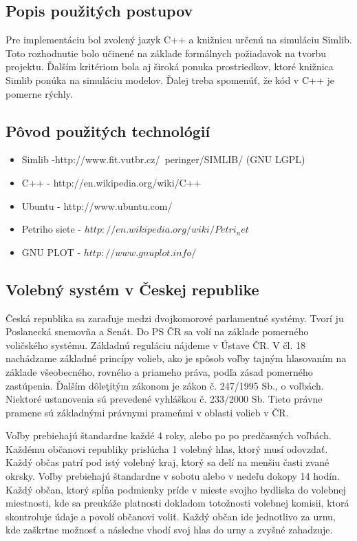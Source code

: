 \documentclass[12pt,a4paper,titlepage,final]{article}
\begin{document}
\subsection{Popis použitých postupov}
Pre implementáciu bol zvolený jazyk C++ a knižnicu určenú na simuláciu Simlib. Toto rozhodnutie bolo učinené na základe formálnych požiadavok na tvorbu projektu. Ďalším kritériom bola aj široká ponuka prostriedkov, ktoré knižnica Simlib ponúka na simuláciu modelov. Ďalej treba spomenúť, že kód v C++ je pomerne rýchly.



\subsection{Pôvod použitých technológií}
\begin{itemize}
\item Simlib -http://www.fit.vutbr.cz/~peringer/SIMLIB/ (GNU LGPL)
\item C++ - http://en.wikipedia.org/wiki/C++
\item Ubuntu - http://www.ubuntu.com/
\item Petriho siete - $http://en.wikipedia.org/wiki/Petri_net$
\item GNU PLOT - $http://www.gnuplot.info/$

\end{itemize}
\subsection{Volebný systém v Českej republike}
Česká republika sa zaraďuje medzi dvojkomorové parlamentné 
systémy. Tvorí ju Poslanecká snemovňa a Senát. Do PS ČR sa volí na 
základe pomerného voličského systému. Základnú reguláciu nájdeme 
v Ústave ČR. V čl. 18 nachádzame základné princípy volieb, ako je spôsob 
voľby tajným hlasovaním na základe všeobecného, rovného a priameho 
práva, podľa zásad pomerného zastúpenia. Ďalším dôleţitým zákonom je 
zákon č. 247/1995 Sb., o voľbách. Niektoré ustanovenia sú prevedené 
vyhláškou č. 233/2000 Sb. Tieto právne pramene sú základnými právnymi 
prameňmi v oblasti volieb v ČR.\cite{Seda:Voleb}

Voľby prebiehajú štandardne každé 4 roky, alebo po po predčasných voľbách. Každému občanovi republiky prislúcha 1 volebný hlas, ktorý musí odovzdať. Každý občas patrí pod istý volebný kraj, ktorý sa delí na menšiu časti zvané okrsky. Voľby prebiehajú štandardne v sobotu alebo v nedeľu dokopy 14 hodín. Každý občan, ktorý spĺňa podmienky príde v mieste svojho bydliska do volebnej miestnosti, kde sa preukáže platnosti dokladom totožnosti volebnej komisii, ktorá skontroluje údaje a povolí občanovi voliť. Každý občan ide jednotlivo za urnu, kde zaškrtne možnosť a následne vhodí svoj hlas do urny a zvyšné zahadzuje.
\end{document}
